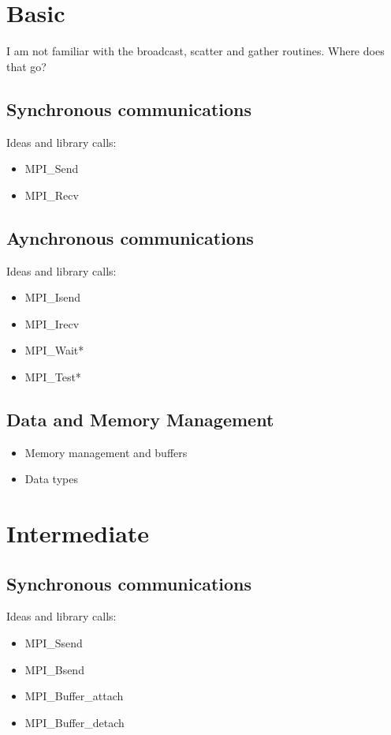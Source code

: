 \section{Basic}

I am not familiar with the broadcast, scatter and gather
routines. Where does that go?

\subsection{Synchronous communications}

Ideas and library calls: \\
\begin{itemize}
\item MPI_Send
\item MPI_Recv
\end{itemize}

\subsection{Aynchronous communications}

Ideas and library calls: \\
\begin{itemize}
\item MPI_Isend
\item MPI_Irecv
\item MPI_Wait*
\item MPI_Test*
\end{itemize}

\subsection{Data and Memory Management}

\begin{itemize}
\item Memory management and buffers
\item Data types
\end{itemize}

\section{Intermediate}

\subsection{Synchronous communications}

Ideas and library calls: \\
\begin{itemize}
\item MPI_Ssend
\item MPI_Bsend
\item MPI_Buffer_attach
\item MPI_Buffer_detach 
\end{itemize}

